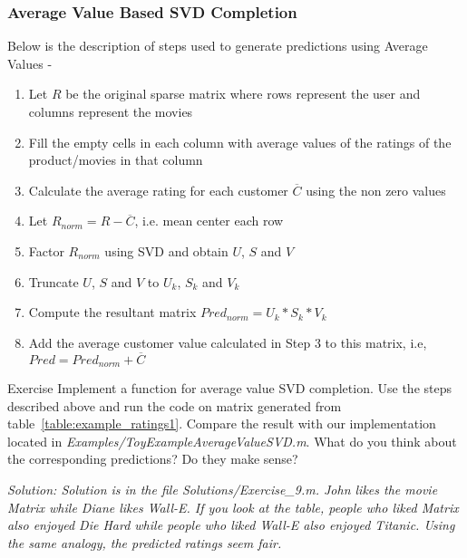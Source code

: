   \subsubsection{Average Value Based SVD Completion} 
  Below is the description of steps used to generate predictions using Average Values -
  \begin{enumerate}
    \item Let $R$ be the original sparse matrix where rows represent the user and columns represent the movies
    \item Fill the empty cells in each column with average values of the ratings of the product/movies in that column
    \item Calculate the average rating for each customer $\overline{C}$ using the non zero values
    \item Let $R_{norm} = R - \overline{C}$, i.e. mean center each row 
    \item Factor $R_{norm}$ using SVD and obtain $U$, $S$ and $V$
    \item Truncate $U$, $S$ and $V$ to $U_k$, $S_k$ and $V_k$
    \item Compute the resultant matrix $Pred_{norm} = U_k*S_k*V_k$
    \item Add the average customer value calculated in Step 3 to this matrix, i.e, $Pred = Pred_{norm} + \overline{C} $
   \end{enumerate}
\begin{myremark}{Exercise }
Implement a function for average value SVD completion. Use the steps described above and run the code on matrix generated from table~\ref{table:example_ratings1}. Compare the result with our implementation located in \textit{Examples/ToyExampleAverageValueSVD.m}. What do you think about the corresponding predictions? Do they make sense? 
\end{myremark}
\textit{Solution: Solution is in the file Solutions/Exercise\_9.m. John likes the movie Matrix while Diane likes Wall-E. If you look at the table, people who liked Matrix also enjoyed Die Hard while people who liked Wall-E also enjoyed Titanic. Using the same analogy, the predicted ratings seem fair.}

